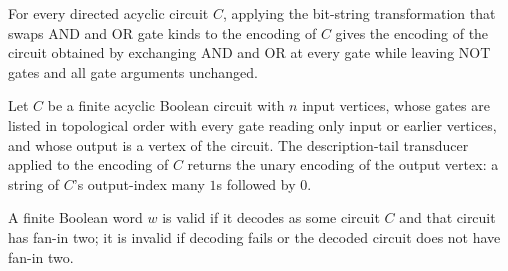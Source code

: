 \begin{theorem}
\label{BoolCircuit.CktSatReduction.swapKinds_encode}
\leanok
{}
For every directed acyclic circuit $C$, applying the bit-string transformation that
swaps AND and OR gate kinds to the encoding of $C$ gives the encoding of the circuit
obtained by exchanging AND and OR at every gate while leaving NOT gates and all gate
arguments unchanged.
\end{theorem}

\begin{theorem}
\label{BoolCircuit.CktSatReduction.descTail_encode}
\leanok
{}
Let $C$ be a finite acyclic Boolean circuit with $n$ input vertices, whose gates are
listed in topological order with every gate reading only input or earlier vertices, and
whose output is a vertex of the circuit. The description-tail transducer applied to the
encoding of $C$ returns the unary encoding of the output vertex: a string of $C$'s
output-index many $1$s followed by $0$.
\end{theorem}

\begin{definition}
\label{BoolCircuit.CktSatReduction.isValid}
\leanok
{}
A finite Boolean word $w$ is valid if it decodes as some circuit $C$ and that circuit
has fan-in two; it is invalid if decoding fails or the decoded circuit does not have
fan-in two.
\end{definition}

